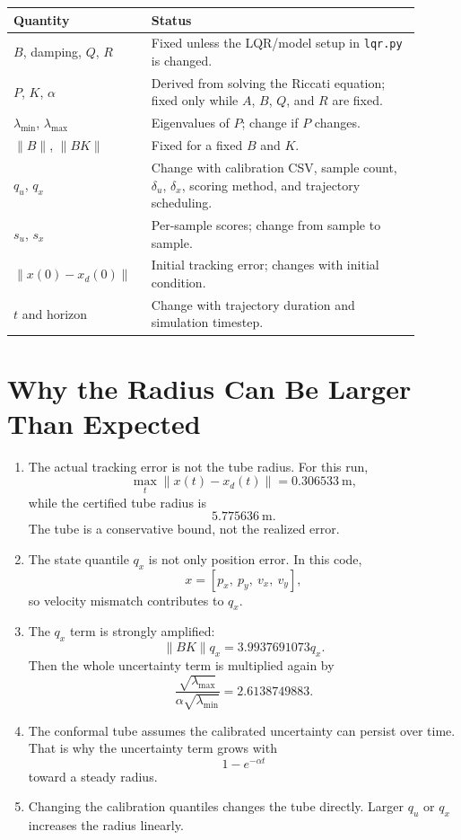 \documentclass[11pt]{article}
\begin{document}
\begin{center}
\begin{tabular}{>{\raggedright\arraybackslash}p{0.28\linewidth}
                >{\raggedright\arraybackslash}p{0.62\linewidth}}
\hline
Quantity & Status \\
\hline
$B$, damping, $Q$, $R$ & Fixed unless the LQR/model setup in \texttt{lqr.py} is changed.\\
$P$, $K$, $\alpha$ & Derived from solving the Riccati equation; fixed only while $A$, $B$, $Q$, and $R$ are fixed.\\
$\lambda_{\min}$, $\lambda_{\max}$ & Eigenvalues of $P$; change if $P$ changes.\\
$\|B\|$, $\|BK\|$ & Fixed for a fixed $B$ and $K$.\\
$q_u$, $q_x$ & Change with calibration CSV, sample count, $\delta_u$, $\delta_x$, scoring method, and trajectory scheduling.\\
$s_u$, $s_x$ & Per-sample scores; change from sample to sample.\\
$\|x(0)-x_d(0)\|$ & Initial tracking error; changes with initial condition.\\
$t$ and horizon & Change with trajectory duration and simulation timestep.\\
\hline
\end{tabular}
\end{center}

\section*{Why the Radius Can Be Larger Than Expected}

\begin{enumerate}
\item The actual tracking error is not the tube radius.  For this run,
\[
\max_t \|x(t)-x_d(t)\| = 0.306533\ \text{m},
\]
while the certified tube radius is
\[
5.775636\ \text{m}.
\]
The tube is a conservative bound, not the realized error.

\item The state quantile $q_x$ is not only position error.  In this code,
\[
x = [p_x,\ p_y,\ v_x,\ v_y],
\]
so velocity mismatch contributes to $q_x$.

\item The $q_x$ term is strongly amplified:
\[
\|BK\|q_x = 3.9937691073 q_x.
\]
Then the whole uncertainty term is multiplied again by
\[
\frac{\sqrt{\lambda_{\max}}}{\alpha\sqrt{\lambda_{\min}}}
= 2.6138749883.
\]

\item The conformal tube assumes the calibrated uncertainty can persist over
time.  That is why the uncertainty term grows with
\[
1-e^{-\alpha t}
\]
toward a steady radius.

\item Changing the calibration quantiles changes the tube directly.  Larger
$q_u$ or $q_x$ increases the radius linearly.
\end{enumerate}
\end{document}

